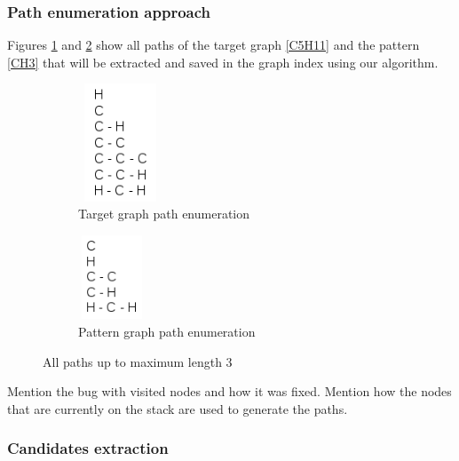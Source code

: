 \documentclass{l4proj}
\theoremstyle{definition}
\begin{document}
         
\subsubsection{Path enumeration approach} %

Figures \ref{C5H11-paths} and \ref{CH3-paths} show all paths of the target graph \ref{C5H11} and the pattern \ref{CH3} that will be extracted and saved in the graph index using our algorithm.

\begin{figure}[h]
\centering
\begin{subfigure}{.5\textwidth}
  \centering
  \includegraphics[height=3.5cm,width=2.5cm]{C5H11-paths.png}
  \caption{Target graph path enumeration}
  \label{C5H11-paths}
\end{subfigure}%
\begin{subfigure}{.5\textwidth}
  \centering
  \includegraphics[height=2.5cm,width=2cm]{CH3-paths.png}
  \caption{Pattern graph path enumeration}
  \label{CH3-paths}
\end{subfigure}
\caption{All paths up to maximum length 3}
\label{A-B}
\end{figure}


Mention the bug with visited nodes and how it was fixed. Mention how the nodes that are currently on the stack are used to generate the paths.

\subsubsection{Candidates extraction}
         
\end{document}
